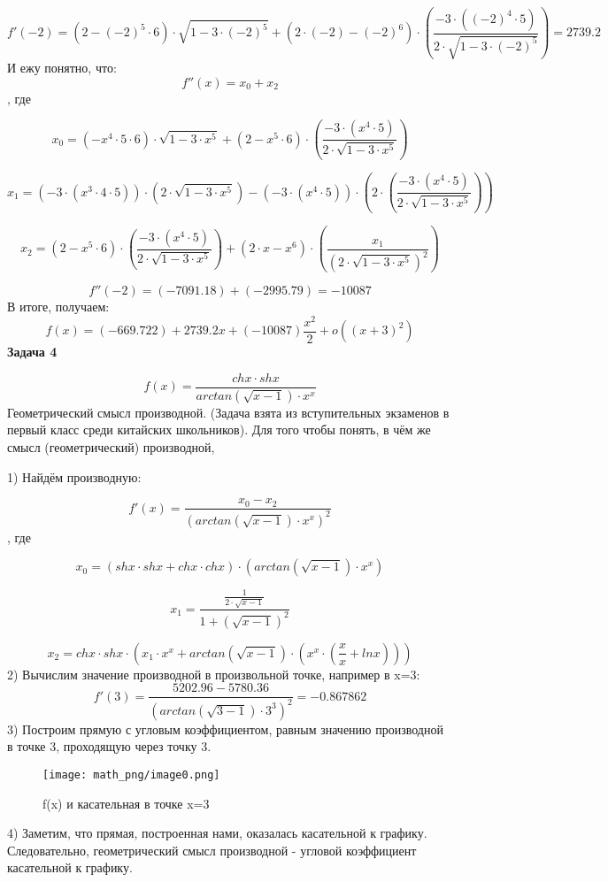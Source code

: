 \documentclass[12pt,a4paper,fleqn]{article}
\begin{document}
$$
f'(-2)=\left(2-(-2)^{5}\cdot6\right)\cdot\sqrt{1-3\cdot(-2)^{5}}+\left(2\cdot(-2)-(-2)^{6}\right)\cdot\left(\frac{-3\cdot\left((-2)^{4}\cdot5\right)}{2\cdot\sqrt{1-3\cdot(-2)^{5}}}\right)=2739.2
$$
И ежу понятно, что:
$$
f''(x)= x_{0}+ x_{2}
$$
, где

$$
x_{0} = \left(- x^{4}\cdot5\cdot6\right)\cdot\sqrt{1-3\cdot x^{5}}+\left(2- x^{5}\cdot6\right)\cdot\left(\frac{-3\cdot\left( x^{4}\cdot5\right)}{2\cdot\sqrt{1-3\cdot x^{5}}}\right)
$$

$$
x_{1} = \left(-3\cdot\left( x^{3}\cdot4\cdot5\right)\right)\cdot\left(2\cdot\sqrt{1-3\cdot x^{5}}\right)-\left(-3\cdot\left( x^{4}\cdot5\right)\right)\cdot\left(2\cdot\left(\frac{-3\cdot\left( x^{4}\cdot5\right)}{2\cdot\sqrt{1-3\cdot x^{5}}}\right)\right)
$$

$$
x_{2} = \left(2- x^{5}\cdot6\right)\cdot\left(\frac{-3\cdot\left( x^{4}\cdot5\right)}{2\cdot\sqrt{1-3\cdot x^{5}}}\right)+\left(2\cdot x- x^{6}\right)\cdot\left(\frac{ x_{1}}{\left(2\cdot\sqrt{1-3\cdot x^{5}}\right)^{2}}\right)
$$

$$
f''(-2)=(-7091.18)+(-2995.79)=-10087
$$
В итоге, получаем:
$$
f(x)=(-669.722)+2739.2x+(-10087)\frac{x^2}{2}+o((x+3)^{2})
$$
{\bf \Large
Задача 4
}

$$
f(x)=\frac{ ch x\cdot sh x}{ arctan\left(\sqrt{ x-1}\right)\cdot x^{ x}}
$$
Геометрический смысл производной. (Задача взята из вступительных экзаменов в первый класс среди китайских школьников). Для того чтобы понять, в чём же смысл (геометрический) производной,

1) Найдём производную:

$$
f'(x)=\frac{ x_{0}- x_{2}}{\left( arctan\left(\sqrt{ x-1}\right)\cdot x^{ x}\right)^{2}}
$$
, где

$$
x_{0} = \left( sh x\cdot sh x+ ch x\cdot ch x\right)\cdot\left( arctan\left(\sqrt{ x-1}\right)\cdot x^{ x}\right)
$$

$$
x_{1} = \frac{\frac{1}{2\cdot\sqrt{ x-1}}}{1+\left(\sqrt{ x-1}\right)^{2}}
$$

$$
x_{2} =  ch x\cdot sh x\cdot\left( x_{1}\cdot x^{ x}+ arctan\left(\sqrt{ x-1}\right)\cdot\left( x^{ x}\cdot\left(\frac{ x}{ x}+ ln x\right)\right)\right)
$$
2) Вычислим значение производной в произвольной точке, например в x=3:
$$
f'(3)=\frac{5202.96-5780.36}{\left( arctan\left(\sqrt{3-1}\right)\cdot3^{3}\right)^{2}}=-0.867862
$$
3) Построим прямую с угловым коэффициентом, равным значению производной в точке 3, проходящую через точку 3.

\begin{figure}[h]
\texttt{[image: math\_png/image0.png]}
\caption{f(x) и касательная в точке x=3}
\end{figure}4) Заметим, что прямая, построенная нами, оказалась касательной к графику. Следовательно, геометрический смысл производной - угловой коэффициент касательной к графику.
\end{document}
